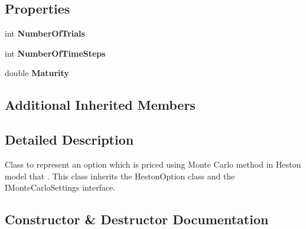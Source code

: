 \subsection*{Properties}
\begin{DoxyCompactItemize}
\item 
\mbox{\label{class_heston_model_1_1_classes_1_1_heston_m_c_a297d32b5b9a24ef161c112d6e2d8b0b6}} 
int {\bfseries Number\+Of\+Trials}
\item 
\mbox{\label{class_heston_model_1_1_classes_1_1_heston_m_c_a65227cc24653c68cba13235c8f6888ca}} 
int {\bfseries Number\+Of\+Time\+Steps}
\item 
\mbox{\label{class_heston_model_1_1_classes_1_1_heston_m_c_ac34d04390c29f55e8e2119fecb55619e}} 
double {\bfseries Maturity}
\end{DoxyCompactItemize}
\subsection*{Additional Inherited Members}


\subsection{Detailed Description}
Class to represent an option which is priced using Monte Carlo method in Heston model that . This class inherits the Heston\+Option class and the I\+Monte\+Carlo\+Settings interface. 



\subsection{Constructor \& Destructor Documentation}
\mbox{\label{class_heston_model_1_1_classes_1_1_heston_m_c_ad9ec790e8dddcfd8bdc4c05e8c8a913b}} 
